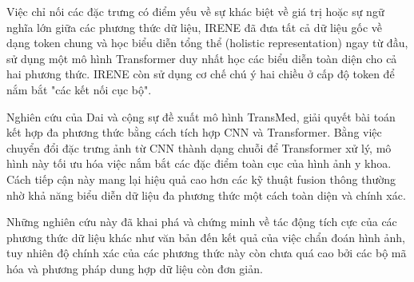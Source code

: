   Việc chỉ nối các đặc trưng có điểm yếu về sự khác biệt về giá trị hoặc sự ngữ nghĩa lớn giữa các phương thức dữ liệu, IRENE \cite{IRENE} đã đưa tất cả dữ liệu gốc về dạng token chung và học biểu diễn tổng thể (holistic representation) ngay từ đầu, sử dụng một mô hình Transformer duy nhất học các biểu diễn toàn diện cho cả hai phương thức. IRENE còn sử dụng cơ chế chú ý hai chiều ở cấp độ token để nắm bắt "các kết nối cục bộ".

  Nghiên cứu của Dai và cộng sự \cite{TransMed21} đề xuất mô hình TransMed, giải quyết bài toán kết hợp đa phương thức bằng cách tích hợp CNN và Transformer. Bằng việc chuyển đổi đặc trưng ảnh từ CNN thành dạng chuỗi để Transformer xử lý, mô hình này tối ưu hóa việc nắm bắt các đặc điểm toàn cục của hình ảnh y khoa. Cách tiếp cận này mang lại hiệu quả cao hơn các kỹ thuật fusion thông thường nhờ khả năng biểu diễn dữ liệu đa phương thức một cách toàn diện và chính xác.
  
  Những nghiên cứu này đã khai phá và chứng minh về tác động tích cực của các phương thức dữ liệu khác như văn bản đến kết quả của việc chẩn đoán hình ảnh, tuy nhiên độ chính xác của các phương thức này còn chưa quá cao bởi các bộ mã hóa và phương pháp dung hợp dữ liệu còn đơn giản.
  

